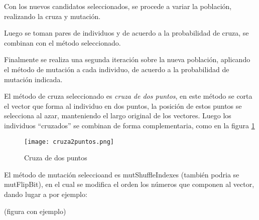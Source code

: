 Con los nuevos candidatos seleccionados, se procede a variar la población,
realizando la cruza y mutación.

Luego se toman pares de individuos y de acuerdo a la probabilidad de cruza, se
combinan con el método seleccionado.

Finalmente se realiza una segunda iteración sobre la nueva población, aplicando
el método de mutación a cada individuo, de acuerdo a la probabilidad de
mutación indicada.


El método de cruza seleccionado es \emph{cruza de dos puntos}, en este método
se corta el vector que forma al individuo en dos puntos, la posición de estos
puntos se selecciona al azar, manteniendo el largo original de los vectores.
%
Luego los individuos ``cruzados'' se combinan de forma complementaria, como en
la figura \ref{fig:cr2puntos}

\begin{figure}
  \centering
  \texttt{[image: cruza2puntos.png]}
  \caption{Cruza de dos puntos}
  \label{fig:cr2puntos}
\end{figure}

%
%
%
%
%

El método de mutación seleccioand es mutShuffleIndexes (también podria se
mutFlipBit), en el cual se modifica el orden los números que componen al vector,
dando lugar a por ejemplo:

(figura con ejemplo)
